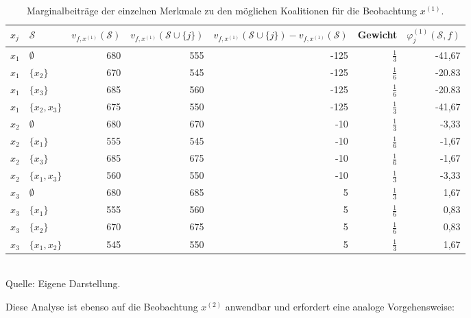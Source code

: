 \begin{table}[!h]
    \caption{Marginalbeiträge der einzelnen Merkmale zu den möglichen Koalitionen für die Beobachtung $x^{(1)}$.}
    \footnotesize
    \begin{tabularx}{\textwidth}{XXrrrrr}
    \toprule
    $x_{j}$ & $\mathcal{S}$ & $v_{f, x^{(1)}}(\mathcal{S})$ & $v_{f, x^{(1)}}(\mathcal{S} \cup \{j\})$ & $v_{f, x^{(1)}}(\mathcal{S} \cup \{j\}) - v_{f, x^{(1)}}(\mathcal{S})$ & Gewicht & $\varphi_{j}^{(1)}(\mathcal{S}, f)$\\
    \midrule
    $x_1$ & $\emptyset$ & 680 & 555 & -125 & $\frac{1}{3}$ & -41,67 \\
    $x_1$ & $\{x_2\}$ & 670 & 545 & -125 & $\frac{1}{6}$ & -20.83 \\
    $x_1$ & $\{x_3\}$ & 685 & 560 & -125 & $\frac{1}{6}$ & -20.83 \\
    $x_1$ & $\{x_2, x_3\}$ & 675 & 550 & -125 & $\frac{1}{3}$ & -41,67 \\
    $x_2$ & $\emptyset$ & 680 & 670 & -10 & $\frac{1}{3}$ & -3,33 \\
    $x_2$ & $\{x_1\}$ & 555 & 545 & -10 & $\frac{1}{6}$ & -1,67 \\
    $x_2$ & $\{x_3\}$ & 685 & 675 & -10 & $\frac{1}{6}$ & -1,67 \\
    $x_2$ & $\{x_1, x_3\}$ & 560 & 550 & -10 & $\frac{1}{3}$ & -3,33 \\
    $x_3$ & $\emptyset$ & 680 & 685 & 5 & $\frac{1}{3}$ & 1,67 \\
    $x_3$ & $\{x_1\}$ & 555 & 560 & 5 & $\frac{1}{6}$ & 0,83 \\
    $x_3$ & $\{x_2\}$ & 670 & 675 & 5 & $\frac{1}{6}$ & 0,83 \\
    $x_3$ & $\{x_1, x_2\}$ & 545 & 550 & 5 & $\frac{1}{3}$ & 1,67 \\
    \bottomrule
    \end{tabularx}
    \label{tab:shapley_marginal_features_x1}
    \normalsize\\
    Quelle: Eigene Darstellung.
\end{table}

Diese Analyse ist ebenso auf die Beobachtung $x^{(2)}$ anwendbar und erfordert eine analoge Vorgehensweise:


